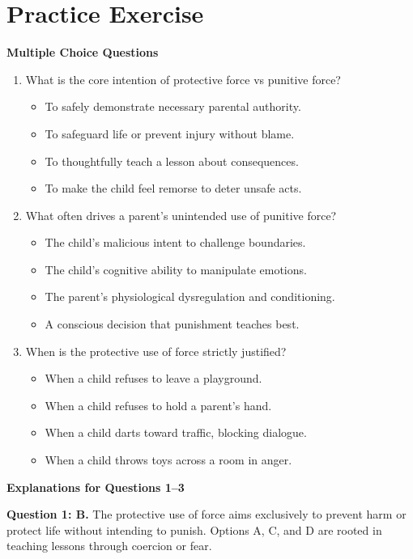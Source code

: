 \section{Practice Exercise}
\begin{practiceexercise}
\textbf{Multiple Choice Questions}
\begin{enumerate}
  \item What is the core intention of protective force vs punitive force?
    \begin{itemize}
      \item[A)] To safely demonstrate necessary parental authority.
      \item[B)] To safeguard life or prevent injury without blame.
      \item[C)] To thoughtfully teach a lesson about consequences.
      \item[D)] To make the child feel remorse to deter unsafe acts.
    \end{itemize}
  \item What often drives a parent's unintended use of punitive force?
    \begin{itemize}
      \item[A)] The child's malicious intent to challenge boundaries.
      \item[B)] The child's cognitive ability to manipulate emotions.
      \item[C)] The parent's physiological dysregulation and conditioning.
      \item[D)] A conscious decision that punishment teaches best.
    \end{itemize}
  \item When is the protective use of force strictly justified?
    \begin{itemize}
      \item[A)] When a child refuses to leave a playground.
      \item[B)] When a child refuses to hold a parent's hand.
      \item[C)] When a child darts toward traffic, blocking dialogue.
      \item[D)] When a child throws toys across a room in anger.
    \end{itemize}
\end{enumerate}

\newpage

\textbf{Explanations for Questions 1--3}

\textbf{Question 1: B.} The protective use of force aims exclusively to prevent harm or protect life without intending to punish.
Options A, C, and D are rooted in teaching lessons through coercion or fear.
\vspace{\fill}


\end{practiceexercise}
